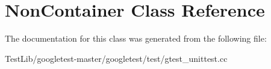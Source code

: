 \hypertarget{classNonContainer}{}\section{Non\+Container Class Reference}
\label{classNonContainer}


The documentation for this class was generated from the following file\+:\begin{DoxyCompactItemize}
\item 
Test\+Lib/googletest-\/master/googletest/test/gtest\+\_\+unittest.\+cc\end{DoxyCompactItemize}
